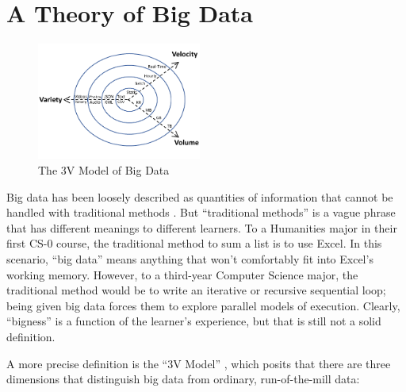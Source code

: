\section{A Theory of Big Data}

\begin{figure}
    \begin{center}
        \includegraphics[width=0.48\textwidth]{"images/3VModel"}
    \end{center}
    \vspace{-\bigskipamount}
    \caption{The 3V Model of Big Data}
    \label{fig-3v}
\end{figure}

Big data has been loosely described as quantities of information that cannot be handled with traditional methods \cite{manyika2011big}.
But ``traditional methods'' is a vague phrase that has different meanings to different learners. To a Humanities major in their first CS-0 course, the traditional method to sum a list is to use Excel. In this scenario, ``big data'' means anything that won't comfortably fit into Excel's working memory.
However, to a third-year Computer Science major, the traditional method would be to write an iterative or recursive sequential loop; being given big data forces them to explore parallel models of execution.
Clearly, ``bigness'' is a function of the learner's experience, but that is still not a solid definition.

A more precise definition is the ``3V Model'' \cite{douglas2012importance}, which posits that there are three dimensions that distinguish big data from ordinary, run-of-the-mill data:

